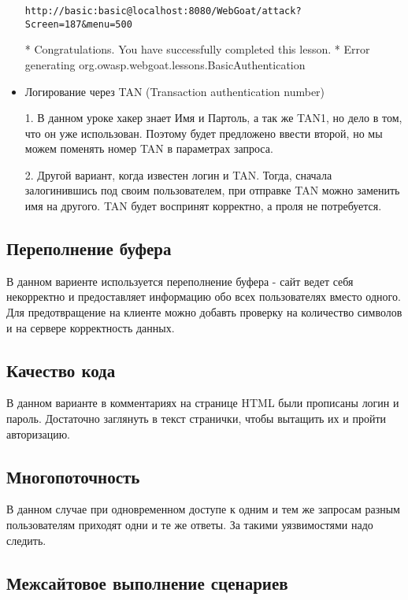 \documentclass{article}
\begin{document}
\begin{itemize}
	\verb'http://basic:basic@localhost:8080/WebGoat/attack?Screen=187&menu=500'
	
	* Congratulations. You have successfully completed this lesson.
	* Error generating org.owasp.webgoat.lessons.BasicAuthentication
	
	
	\item Логирование через TAN (Transaction authentication number)
	
	1. В данном уроке хакер знает Имя и Партоль, а так же TAN1, но дело в том, что он уже использован. Поэтому будет предложено ввести второй, но мы можем поменять номер TAN в параметрах запроса.
	
	2. Другой вариант, когда известен логин и TAN. Тогда, сначала залогинившись под своим пользователем, при отправке TAN можно заменить имя на другого. TAN будет воспринят корректно, а проля не потребуется.
	
\end{itemize}


\subsection{Переполнение буфера}

В данном вариенте используется переполнение буфера - сайт ведет себя некорректно и предоставляет информацию обо всех пользователях вместо одного. 
Для предотвращение на клиенте можно добавть проверку на количество символов и на сервере корректность данных.

\subsection{Качество кода}

В данном варианте в комментариях на странице HTML были прописаны логин и пароль. Достаточно заглянуть в текст странички, чтобы вытащить их и пройти авторизацию.

\subsection{Многопоточность}

В данном случае при одновременном доступе к одним и тем же запросам разным пользователям приходят одни и те же ответы. За такими уязвимостями надо следить.


\subsection{Межсайтовое выполнение сценариев}
\end{document}
